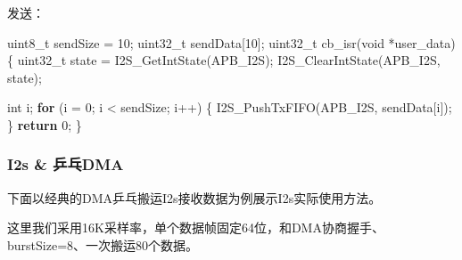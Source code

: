 \documentclass[
  12pt,
]{book}
\newenvironment{Shaded}{\begin{snugshade}}{\end{snugshade}}
\newcommand{\ControlFlowTok}[1]{\textcolor[rgb]{0.13,0.29,0.53}{\textbf{#1}}}
\newcommand{\DataTypeTok}[1]{\textcolor[rgb]{0.13,0.29,0.53}{#1}}
\newcommand{\DecValTok}[1]{\textcolor[rgb]{0.00,0.00,0.81}{#1}}
\newcommand{\NormalTok}[1]{#1}
\begin{document}
发送：

\begin{Shaded}
\begin{Highlighting}[]
\DataTypeTok{uint8_t}\NormalTok{  sendSize = }\DecValTok{10}\NormalTok{;}
\DataTypeTok{uint32_t}\NormalTok{ sendData[}\DecValTok{10}\NormalTok{];}
\DataTypeTok{uint32_t}\NormalTok{ cb_isr(}\DataTypeTok{void}\NormalTok{ *user_data)}
\NormalTok{\{ }
    \DataTypeTok{uint32_t}\NormalTok{ state = I2S_GetIntState(APB_I2S);}
\NormalTok{    I2S_ClearIntState(APB_I2S, state);}

    \DataTypeTok{int}\NormalTok{ i;}
    \ControlFlowTok{for}\NormalTok{ (i = }\DecValTok{0}\NormalTok{; i < sendSize; i++) \{}
\NormalTok{        I2S_PushTxFIFO(APB_I2S, sendData[i]);}
\NormalTok{    \}}
    \ControlFlowTok{return} \DecValTok{0}\NormalTok{;}
\NormalTok{\}}
\end{Highlighting}
\end{Shaded}

\hypertarget{i2s-ux4e52ux4e53dma}{%
\subsubsection{I2s \& 乒乓DMA}\label{i2s-ux4e52ux4e53dma}}

下面以经典的DMA乒乓搬运I2s接收数据为例展示I2s实际使用方法。

这里我们采用16K采样率，单个数据帧固定64位，和DMA协商握手、burstSize=8、一次搬运80个数据。
\end{document}
